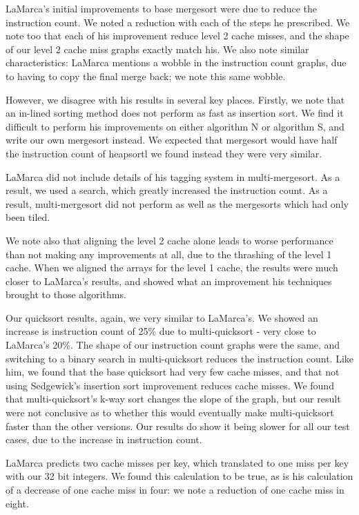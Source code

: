 LaMarca's initial improvements to base mergesort were due to reduce the
instruction count. We noted a reduction with each of the steps he prescribed. We
note too that each of his improvement reduce level 2 cache misses, and the shape
of our level 2 cache miss graphs exactly match his. We also note similar
characteristics: LaMarca mentions a wobble in the instruction count graphs, due to
having to copy the final merge back; we note this same wobble.

However, we disagree with his results in several key places. Firstly, we note
that an in-lined sorting method does not perform as fast as insertion sort. We
find it difficult to perform his improvements on either algorithm N or algorithm
S, and write our own mergesort instead. We expected that mergesort would have
half the instruction count of heapsortl we found instead they were very similar.

LaMarca did not include details of his tagging system in multi-mergesort. As a
result, we used a search, which greatly increased the instruction count. As a
result, multi-mergesort did not perform as well as the mergesorts which had only
been tiled. 

We note also that aligning the level 2 cache alone leads to worse
performance than not making any improvements at all, due to the thrashing of the
level 1 cache. When we aligned the arrays for the level 1 cache, the results
were much closer to LaMarca's results, and showed what an improvement his
techniques brought to those algorithms.


Our quicksort results, again, we very similar to LaMarca's. We showed an
increase is instruction count of 25\% due to multi-quicksort - very close to
LaMarca's 20\%.  The shape of our instruction count graphs were the same, and
switching to a binary search in multi-quicksort reduces the instruction count.
Like him, we found that the base quicksort had very few cache misses, and that
not using Sedgewick's insertion sort improvement reduces cache misses. We found
that multi-quicksort's k-way sort changes the slope of the graph, but our
result were not conclusive as to whether this would eventually make
multi-quicksort faster than the other versions. Our results do show it being
slower for all our test cases, due to the increase in instruction count.

LaMarca predicts two cache misses per key, which translated to one miss per key
with our 32 bit integers. We found this calculation to be true, as is his
calculation of a decrease of one cache miss in four: we note a reduction of one
cache miss in eight.


